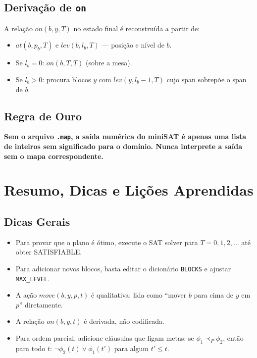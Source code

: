\documentclass[12pt,a4paper]{article}
\begin{document}
\subsection{Derivação de \texttt{on}}

A relação $on(b,y,T)$ no estado final é reconstruída a partir de:

\begin{itemize}[leftmargin=1.2cm]
    \item $at(b, p_b, T)$ e $lev(b, l_b, T)$ — posição e nível de $b$.
    \item Se $l_b = 0$: $on(b, T, T)$ (sobre a mesa).
    \item Se $l_b > 0$: procura blocos $y$ com $lev(y, l_b-1, T)$ cujo span sobrepõe o span de $b$.
\end{itemize}

\subsection{Regra de Ouro}

\textbf{Sem o arquivo \texttt{.map}, a saída numérica do miniSAT é apenas uma lista de inteiros sem significado para o domínio. Nunca interprete a saída sem o mapa correspondente.}

\appendix
\section{Resumo, Dicas e Lições Aprendidas}
\label{sec:resumo}

\subsection{Dicas Gerais}

\begin{itemize}[leftmargin=1.2cm]
    \item Para provar que o plano é ótimo, execute o SAT solver para $T = 0, 1, 2, \dots$ até obter SATISFIABLE.
    \item Para adicionar novos blocos, basta editar o dicionário \texttt{BLOCKS} e ajustar \texttt{MAX\_LEVEL}.
    \item A ação $move(b, y, p, t)$ é qualitativa: lida como ``mover $b$ para cima de $y$ em $p$'' diretamente.
    \item A relação $on(b, y, t)$ é derivada, não codificada.
    \item Para ordem parcial, adicione cláusulas que ligam metas: se $\phi_1 \prec_P \phi_2$, então para todo $t$: $\neg \phi_2(t) \vee \phi_1(t')$ para algum $t' \le t$.
\end{itemize}
\end{document}
